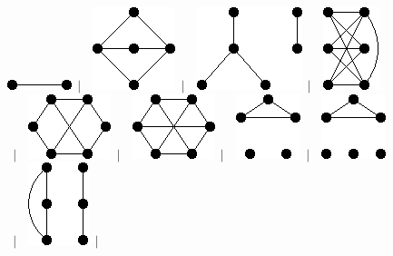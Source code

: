 \documentclass[11pt,paper=b5,footinclude,headinclude]{scrbook} %
\newtheorem{ex}{Vaja\hypertarget{sol:\theex}}[chapter]
\begin{document}
\begin{ex}
\begin{figure}
\includegraphics[scale=0.5]{smallGraphs/g_K2.png}$\,\mid\,$\
\includegraphics[scale=0.5]{smallGraphs/g_K23.png}$\,\mid\,$\
\includegraphics[scale=0.5]{smallGraphs/g_K2Uclaw.png}$\,\mid\,$\
\includegraphics[scale=0.5]{smallGraphs/g_K33+e.png}$\,\mid\,$\
\includegraphics[scale=0.5]{smallGraphs/g_K33-e.png}$\,\mid\,$\
\includegraphics[scale=0.5]{smallGraphs/g_K33.png}$\,\mid\,$\
\includegraphics[scale=0.5]{smallGraphs/g_K3U2K1.png}$\,\mid\,$\
\includegraphics[scale=0.5]{smallGraphs/g_K3U3K1.png}$\,\mid\,$\
\includegraphics[scale=0.5]{smallGraphs/g_K3UP3.png}$\,\mid\,$\

\end{figure}
\end{ex}
\end{document}
